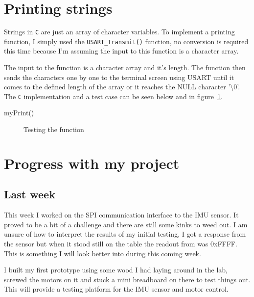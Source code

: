 \documentclass[11pt,a4paper,titlepage]{article}
\begin{document}
	
	\section{Printing strings\label{sec:usartstrings}}
	Strings in \verb|C| are just an array of character variables. To implement a printing function, I simply used the \verb|USART_Transmit()| function, no conversion is required this time because I'm assuming the input to this function is a character array.
	
	The input to the function is a character array and it's length. The function then sends the characters one by one to the terminal screen using USART until it comes to the defined length of the array or it reaches the NULL character '\textbackslash0'. The \verb|C| implementation and a test case can be seen below and in figure~\ref{fig:stringsend}.
	
	\pagebreak
	
	
	
	\begin{verbbox}
		myPrint()
	\end{verbbox}
	\begin{figure}[h]
		\centering
		\caption{Testing the \theverbbox function}
		\label{fig:stringsend}
	\end{figure}
	
	
	\pagebreak
	\section{Progress with my project}
	
	\subsection{Last week}
	This week I worked on the SPI communication interface to the IMU sensor. It proved to be a bit of a challenge and there are still some kinks to weed out. I am unsure of how to interpret the results of my initial testing, I got a response from the sensor but when it stood still on the table the readout from was 0xFFFF. This is something I will look better into during this coming week.
	
	I built my first prototype using some wood I had laying around in the lab, screwed the motors on it and stuck a mini breadboard on there to test things out. This will provide a testing platform for the IMU sensor and motor control.
	
\end{document}
